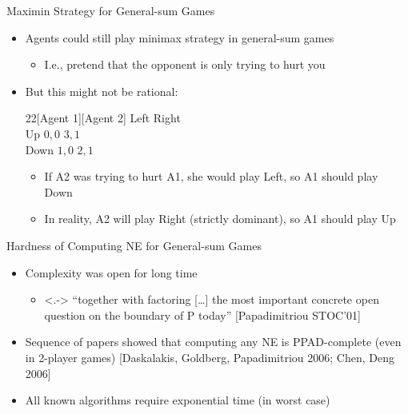 \documentclass[11pt,aspectratio=169,handout]{beamer}
\begin{document}
  \begin{frame}{Maximin Strategy for General-sum Games}
   \begin{itemize}
    \item<1-> Agents could still play minimax strategy in general-sum games
    \begin{itemize}
     \item<2-> I.e., pretend that the opponent is only trying to hurt you
    \end{itemize}
    \item<3-> But this might not be rational:
    \begin{center}
    \hspace{-5em}
     \begin{game}{2}{2}[Agent 1][Agent 2]
         \> Left   \> Right  \\
      Up \> $0,0$ \> $3,1$ \\
      Down \> $1,0$ \> $2,1$
     \end{game}
    \end{center}
    \vspace{1 em}
    \begin{itemize}
     \item<5-> If A2 was trying to hurt A1, she would play Left, so A1 should play Down
     \item<6-> In reality, A2 will play Right (strictly dominant), so A1 should play Up
    \end{itemize}
   \end{itemize}
  \end{frame}

  \begin{frame}{Hardness of Computing NE for General-sum Games }
   \begin{itemize}[<+->]
    \item Complexity was open for long time
    \begin{itemize}
     \item<.-> “together with factoring […] the most important concrete open question on
the boundary of P today” {\scriptsize \color[rgb]{0.29, 0.59, 0.9} [Papadimitriou STOC’01]}
    \end{itemize}
    \item Sequence of papers showed that computing any NE is PPAD-complete
(even in 2-player games) {\scriptsize \color[rgb]{0.29, 0.59, 0.9} [Daskalakis, Goldberg, Papadimitriou 2006; Chen, Deng 2006]}
    \item All known algorithms require \alert{exponential time} (in worst case)
   \end{itemize}
  \end{frame}
\end{document}
